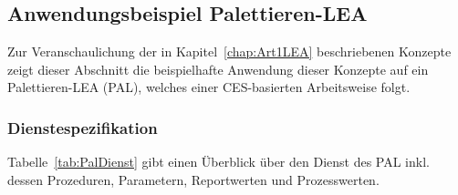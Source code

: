 
\subsection{Anwendungsbeispiel Palettieren-LEA}
\label{subsec:PalettierenLea}

Zur Veranschaulichung der in Kapitel~\ref{chap:Art1LEA} beschriebenen Konzepte zeigt dieser Abschnitt die beispielhafte Anwendung dieser Konzepte auf ein Palettieren-LEA (PAL), welches einer CES-basierten Arbeitsweise folgt.

\subsubsection{Dienstespezifikation}

Tabelle~\ref{tab:PalDienst} gibt einen Überblick über den Dienst des PAL inkl. dessen Prozeduren, Parametern, Reportwerten und Prozesswerten.

